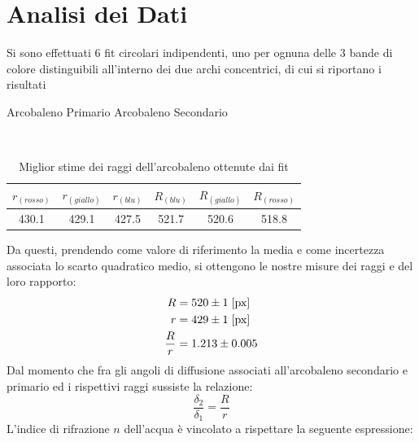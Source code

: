 \documentclass{report}[a4paper,11pt]
\begin{document}
\section{Analisi dei Dati}
Si sono effettuati $6$ fit circolari indipendenti, uno per ognuna delle $3$ bande di colore distinguibili all'interno dei due archi concentrici, di cui si riportano i risultati
\begin{table}[!htb]
  \begin{center}
  \begin{large}
  Arcobaleno Primario \qquad  Arcobaleno Secondario
  \end{large}\\
	\begin{tabular}{ccc|ccc}
	\toprule
	$r_{(rosso)}$  & $r_{(giallo)}$  & $r_{(blu)}$ & $R_{(blu)}$  & $R_{(giallo)}$  & $R_{(rosso)}$ \\
	\midrule
	\midrule
	 430.1 & 429.1 & 427.5 & 521.7 & 520.6 & 518.8 \\ 
	\bottomrule
	\end{tabular}
  \end{center}
  \caption{Miglior stime dei raggi dell'arcobaleno ottenute dai fit\label{tab:arcfit}}
\end{table}
Da questi, prendendo come valore di riferimento la media e come incertezza associata lo scarto quadratico medio, si ottengono le nostre misure dei raggi e del loro rapporto:
\begin{align}
R &= 520 \pm 1 \; [\rm px] \\
r &= 429 \pm 1 \; [\rm px] \\
\frac{R}{r} &= 1.213 \pm 0.005
\end{align}
Dal momento che fra gli angoli di diffusione associati all’arcobaleno secondario e primario ed i rispettivi raggi sussiste la relazione:
\begin{equation}\label{eq:ratio}
\frac{\delta_2}{\delta_1} = \frac{R}{r}
\end{equation}
L'indice di rifrazione $n$ dell'acqua è vincolato a rispettare la seguente espressione:
\end{document}

